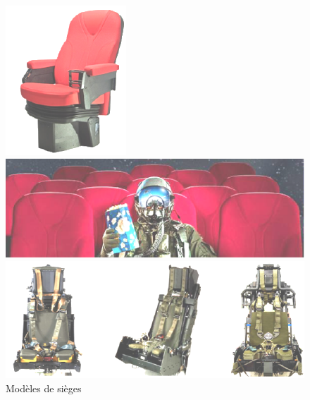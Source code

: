 \begin{figure}[!ht]
\begin{minipage}{0.35\linewidth}
 \centering\includegraphics[width=0.8\linewidth]{img/img01}
\end{minipage}\hfill
\begin{minipage}{0.55\linewidth}
 \centering\includegraphics[width=1\linewidth]{img/img02}
\end{minipage}

\begin{center}
 \includegraphics[width=0.8\linewidth]{img/img03}
\end{center}
\caption{Modèles de sièges}
\label{fig1}
\end{figure}


